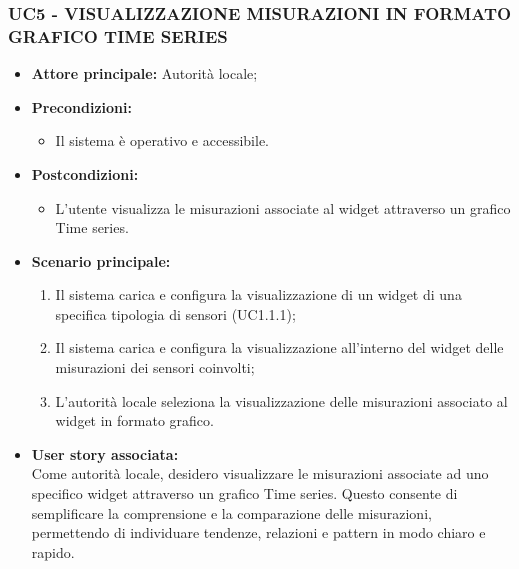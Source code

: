 \subsubsection{UC5 - VISUALIZZAZIONE MISURAZIONI IN FORMATO GRAFICO TIME SERIES}
\begin{itemize}
    \item \textbf{Attore principale:} Autorità locale;
    \item \textbf{Precondizioni:}
        \begin{itemize}
            \item Il sistema è operativo e accessibile.
        \end{itemize}
    \item \textbf{Postcondizioni:}
        \begin{itemize}
            \item L'utente visualizza le misurazioni associate al widget attraverso un grafico Time series.
        \end{itemize}
    \item \textbf{Scenario principale:}
        \begin{enumerate}
            \item Il sistema carica e configura la visualizzazione di un widget di una specifica tipologia di sensori (UC1.1.1);
                \item Il sistema carica e configura la visualizzazione all'interno del widget delle misurazioni dei sensori coinvolti;
                \item L'autorità locale seleziona la visualizzazione delle misurazioni associato al widget in formato grafico.
        \end{enumerate}
    \item \textbf{User story associata:} \\
        Come autorità locale, desidero visualizzare le misurazioni associate ad uno specifico widget attraverso un grafico Time series. Questo consente di semplificare la comprensione e la comparazione delle misurazioni, permettendo di individuare tendenze, relazioni e pattern in modo chiaro e rapido.
\end{itemize}